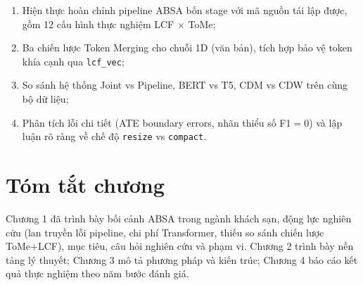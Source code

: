 \begin{enumerate}
  \item Hiện thực hoàn chỉnh pipeline ABSA bốn stage với mã nguồn tái lập được, gồm 12
        cấu hình thực nghiệm LCF $\times$ ToMe;
  \item Ba chiến lược Token Merging cho chuỗi 1D (văn bản), tích hợp bảo vệ token khía
        cạnh qua \texttt{lcf\_vec};
  \item So sánh hệ thống Joint vs Pipeline, BERT vs T5, CDM vs CDW trên cùng bộ dữ liệu;
  \item Phân tích lỗi chi tiết (ATE boundary errors, nhãn thiểu số F1$=0$) và lập luận
        rõ ràng về chế độ \texttt{resize} vs \texttt{compact}.
\end{enumerate}

\section*{Tóm tắt chương}

Chương 1 đã trình bày bối cảnh ABSA trong ngành khách sạn, động lực nghiên cứu (lan
truyền lỗi pipeline, chi phí Transformer, thiếu so sánh chiến lược ToMe+LCF), mục tiêu,
câu hỏi nghiên cứu và phạm vi. Chương 2 trình bày nền tảng lý thuyết; Chương 3 mô tả
phương pháp và kiến trúc; Chương 4 báo cáo kết quả thực nghiệm theo năm bước đánh giá.
